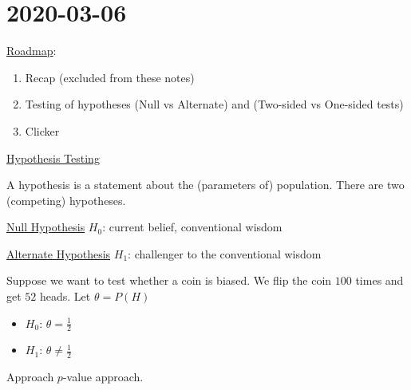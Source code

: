 \section{2020-03-06}
\underline{Roadmap}:
\begin{enumerate}[label=(\roman*)]
    \item Recap (excluded from these notes)
    \item Testing of hypotheses (Null vs Alternate) and (Two-sided vs One-sided tests)
    \item Clicker
\end{enumerate}
\underline{Hypothesis Testing}
\begin{defbox}
    \begin{definition}
        A hypothesis is a statement about the (parameters of) population. There
        are two (competing) hypotheses.

        \underline{Null Hypothesis} $ H_0 $: current belief, conventional wisdom

        \underline{Alternate Hypothesis} $ H_1 $: challenger to the conventional wisdom
    \end{definition}
\end{defbox}

\begin{exbox}
    \begin{example}
        Suppose we want to test whether a coin is biased. We flip the coin $ 100 $
        times and get $ 52 $ heads. Let $ \theta=P(H) $
        \begin{itemize}
            \item $ H_0 $: $ \theta=\frac{1}{2} $
            \item $ H_1 $: $ \theta\neq \frac{1}{2} $
        \end{itemize}
        Approach $ p $-value approach.
    \end{example}
\end{exbox}

